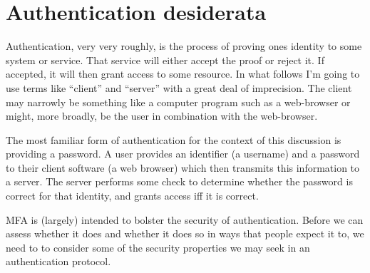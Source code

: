 \documentclass{soups}
\begin{document}
\section{Authentication desiderata}\label{sec:desiderata}

Authentication, very very roughly, is the process of proving ones identity to some system or service.
That service will either accept the proof or reject it.
If accepted, it will then grant access to some resource. In what follows I'm going to use terms like ``client'' and ``server'' with a great deal of imprecision. The client may narrowly be something like a computer program such as a web-browser or might, more broadly, be the user in combination with the web-browser.

The most familiar form of authentication for the context of this discussion is providing a password. A user provides an identifier (a username) and a password to their client software (a web browser) which then transmits this information to a server. The server performs some check to determine whether the password is correct for that identity, and grants access iff it is correct.

MFA is (largely) intended to bolster the security of authentication.
Before we can assess whether it does and whether it does so in ways that people expect it to,
we need to to consider some of the security properties we may seek in an authentication protocol.
\end{document}
